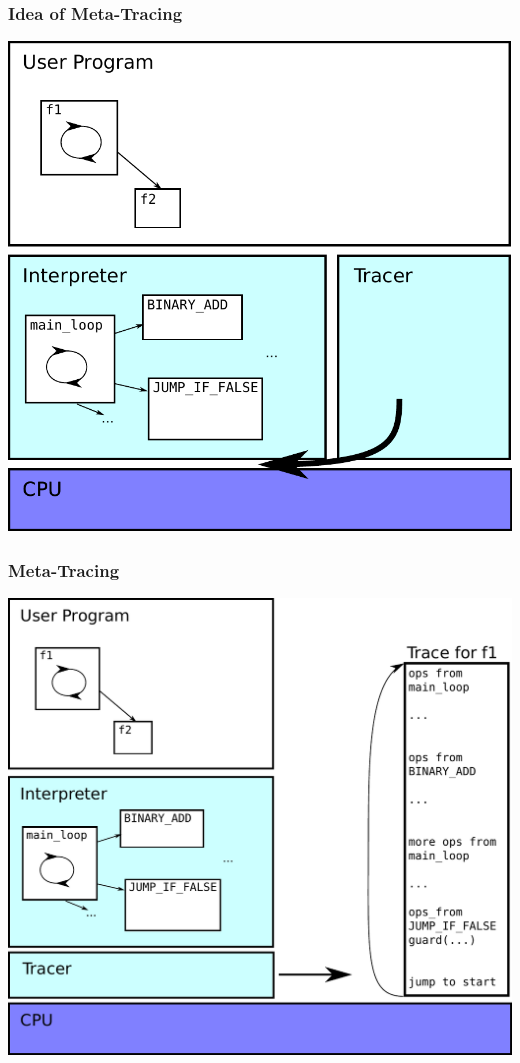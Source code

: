 \documentclass[utf8x]{beamer}
\begin{document}
\begin{frame}
  \frametitle{Idea of Meta-Tracing}
  \includegraphics[scale=0.5]{figures/trace05.pdf}
\end{frame}

\begin{frame}
  \frametitle{Meta-Tracing}
  \includegraphics[scale=0.5]{figures/metatrace01.pdf}
\end{frame}
\end{document}
